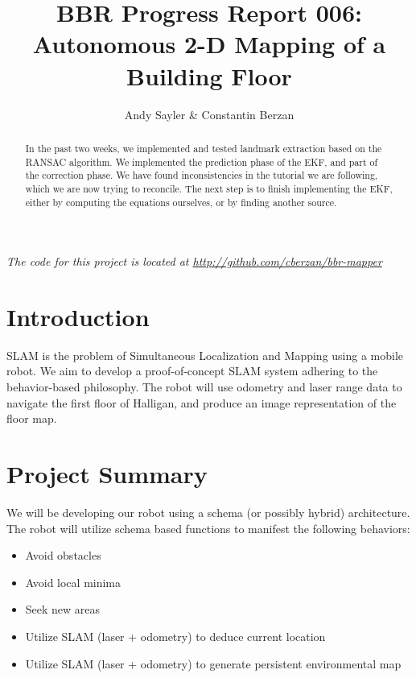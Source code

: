 \documentclass[12pt]{article}
\begin{document}
\title{BBR Progress Report 006:\\ Autonomous 2-D Mapping of a Building Floor}
\author{Andy Sayler \& Constantin Berzan}
\maketitle

\begin{abstract}
In the past two weeks, we implemented and tested landmark extraction based on
the RANSAC algorithm. We implemented the prediction phase of the EKF, and part
of the correction phase. We have found inconsistencies in the tutorial we are
following, which we are now trying to reconcile. The next step is to finish
implementing the EKF, either by computing the equations ourselves, or by finding
another source.
\end{abstract}

\emph{The code for this project is located at
\url{http://github.com/cberzan/bbr-mapper}}

\section{Introduction}
SLAM is the problem of Simultaneous Localization and Mapping using a mobile
robot.  We aim to develop a proof-of-concept SLAM system adhering to the
behavior-based philosophy.  The robot will use odometry and laser range data to
navigate the first floor of Halligan, and produce an image representation of
the floor map.

\section{Project Summary}

We will be developing our robot using a schema (or possibly hybrid)
architecture. The robot will utilize schema based functions to manifest the
following behaviors:

\begin{itemize}
    \setlength{\itemsep}{0pt}
    \setlength{\parskip}{0pt}
    \setlength{\parsep}{0pt}
    \item Avoid obstacles
    \item Avoid local minima
    \item Seek new areas
    \item Utilize SLAM (laser + odometry) to deduce current location
    \item Utilize SLAM (laser + odometry) to generate persistent environmental
          map
\end{itemize}
\end{document}
